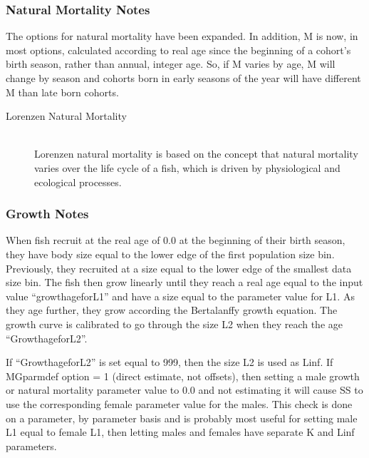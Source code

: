 \subsubsection{Natural Mortality Notes}
The options for natural mortality have been expanded.  In addition, M is now, in most options, calculated according to real age since the beginning of a cohort’s birth season, rather than annual, integer age.  So, if M varies by age, M will change by season and cohorts born in early seasons of the year will have different M than late born cohorts.

\hypertarget{Lorenzen}{}
\begin{description}
	\item[Lorenzen Natural Mortality]\hfil\\
	Lorenzen natural mortality is based on the concept that natural mortality varies over the life cycle of a fish, which is driven by physiological and ecological processes.
\end{description}

\subsubsection{Growth Notes}
\hypertarget{A1}{}
When fish recruit at the real age of 0.0 at the beginning of their birth season, they have body size equal to the lower edge of the first population size bin.  Previously, they recruited at a size equal to the lower edge of the smallest data size bin.  The fish then grow linearly until they reach a real age equal to the input value “growth\textunderscore age\textunderscore for\textunderscore L1” and have a size equal to the parameter value for L1.  As they age further, they grow according the Bertalanffy growth equation.  The growth curve is calibrated to go through the size L2 when they reach the age “Growth\textunderscore age\textunderscore for\textunderscore L2”.

If “Growth\textunderscore age\textunderscore for\textunderscore L2” is set equal to 999, then the size L2 is used as Linf.  If MGparm\textunderscore def option = 1 (direct estimate, not offsets), then setting a male growth or natural mortality parameter value to 0.0 and not estimating it will cause SS to use the corresponding female parameter value for the males. This check is done on a parameter, by parameter basis and is probably most useful for setting male L1 equal to female L1, then letting males and females have separate K and Linf parameters.

